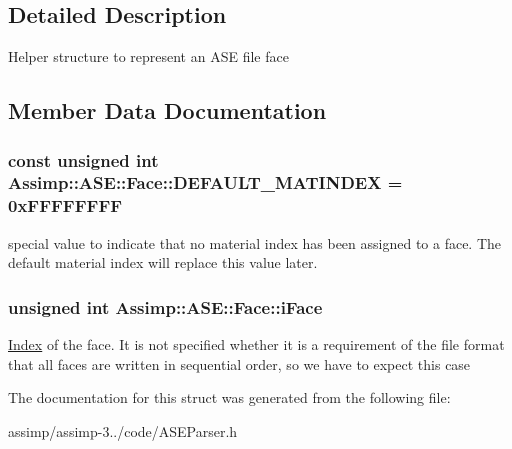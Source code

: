 \subsection{Detailed Description}
Helper structure to represent an A\+S\+E file face 

\subsection{Member Data Documentation}
\hypertarget{struct_assimp_1_1_a_s_e_1_1_face_ab6f79b5a2df7c665ec7d56a258f8391f}{
\subsubsection[{D\+E\+F\+A\+U\+L\+T\+\_\+\+M\+A\+T\+I\+N\+D\+E\+X}]{\setlength{\rightskip}{0pt plus 5cm}const unsigned int Assimp\+::\+A\+S\+E\+::\+Face\+::\+D\+E\+F\+A\+U\+L\+T\+\_\+\+M\+A\+T\+I\+N\+D\+E\+X = 0x\+F\+F\+F\+F\+F\+F\+F\+F\hspace{0.3cm}{\ttfamily [static]}}}\label{struct_assimp_1_1_a_s_e_1_1_face_ab6f79b5a2df7c665ec7d56a258f8391f}
special value to indicate that no material index has been assigned to a face. The default material index will replace this value later. \hypertarget{struct_assimp_1_1_a_s_e_1_1_face_adbcb29737e7cad53d0681baf04230491}{
\subsubsection[{i\+Face}]{\setlength{\rightskip}{0pt plus 5cm}unsigned int Assimp\+::\+A\+S\+E\+::\+Face\+::i\+Face}}\label{struct_assimp_1_1_a_s_e_1_1_face_adbcb29737e7cad53d0681baf04230491}
\hyperlink{struct_index}{Index} of the face. It is not specified whether it is a requirement of the file format that all faces are written in sequential order, so we have to expect this case 

The documentation for this struct was generated from the following file\+:\begin{DoxyCompactItemize}
\item 
assimp/assimp-\/3../code/A\+S\+E\+Parser.\+h\end{DoxyCompactItemize}
